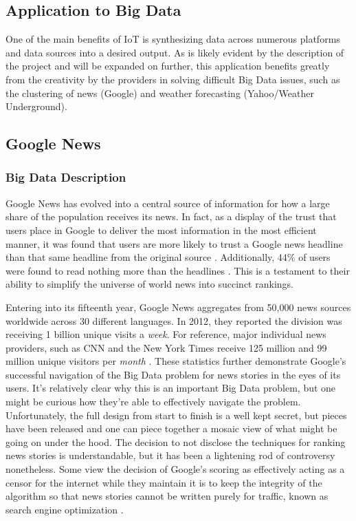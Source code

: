 \documentclass[sigconf]{acmart}
\begin{document}
\subsection{Application to Big Data}
One of the main benefits of IoT is synthesizing data across numerous platforms and data sources into a desired output. As is likely evident by the description of the project and will be expanded on further, this application benefits greatly from the creativity by the providers in solving difficult Big Data issues, such as the  clustering of news (Google) and weather forecasting (Yahoo/Weather Underground). 

\subsection{Google News}
\subsubsection{Big Data Description}
Google News has evolved into a central source of information for how a large share of the population receives its news. In fact, as a display of the trust that users place in Google to deliver the most information in the most efficient manner, it was found that users are more likely to trust a Google news headline than that same headline from the original source \cite{edelman}. Additionally, $44\%$ of users were found to read nothing more than the headlines \cite{googleheadlines}. This is a testament to their ability to simplify the universe of world news into succinct rankings. 

Entering into its fifteenth year, Google News aggregates from 50,000 news sources worldwide across 30 different languages. In 2012, they reported the division was receiving 1 billion unique visits a \emph{week}\cite{krishna}. For reference, major individual news providers, such as CNN and the New York Times receive 125 million and 99 million unique visitors per \emph{month} \cite{nytimes}. These statistics further demonstrate Google's successful navigation of the Big Data problem for news stories in the eyes of its users. 
It's relatively clear why this is an important Big Data problem, but one might be curious how they're able to effectively navigate the problem. Unfortunately, the full design from start to finish is a well kept secret, but pieces have been released and one can piece together a mosaic view of what might be going on under the hood. The decision to not disclose the techniques for ranking news stories is understandable, but it has been a lightening rod of controversy nonetheless. Some view the decision of Google's scoring as effectively acting as a censor for the internet while they maintain it is to keep the integrity of the algorithm so that news stories cannot be written purely for traffic, known as search engine optimization \cite{censor}. 
\end{document}
